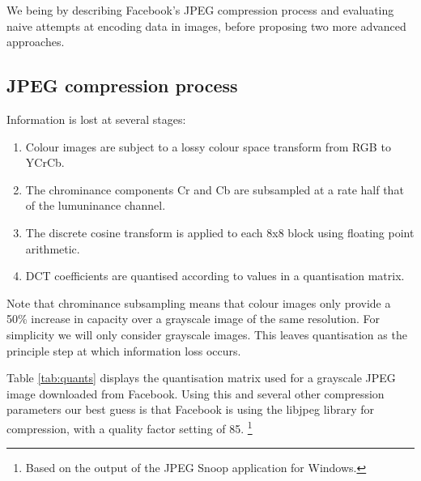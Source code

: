 We being by describing Facebook's JPEG compression process and evaluating naive attempts at encoding data in images, before proposing two more advanced approaches.

\FloatBarrier
\subsection{JPEG compression process}

Information is lost at several stages:

\begin{enumerate}

    \item Colour images are subject to a lossy colour space transform from RGB to YCrCb.
    \item The chrominance components Cr and Cb are subsampled at a rate half that of the lumuninance channel.
    \item The discrete cosine transform is applied to each 8x8 block using floating point arithmetic.
    \item DCT coefficients are quantised according to values in a quantisation matrix.
    
\end{enumerate}

Note that chrominance subsampling means that colour images only provide a 50\% increase in capacity over a grayscale image of the same resolution. For simplicity we will only consider grayscale images. This leaves quantisation as the principle step at which information loss occurs.

Table \ref{tab:quants} displays the quantisation matrix used for a grayscale JPEG image downloaded from Facebook. Using this and several other compression parameters our best guess is that Facebook is using the libjpeg library for compression, with a quality factor setting of 85. \footnote{Based on the output of the JPEG Snoop application for Windows.}


